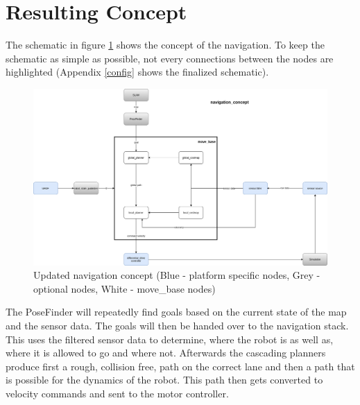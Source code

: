 \section{Resulting Concept}
The schematic in figure \ref{navconcept} shows the concept of the navigation.  To keep the schematic as simple as possible, not every connections between the nodes are highlighted (Appendix \ref{config} shows the finalized schematic).\\

\begin{figure}[H]
	\begin{center}
		\includegraphics[width=140mm]{Pictures/Updated navigation concept}
		\caption[updated navigation concept]{Updated navigation concept (Blue - platform specific nodes, Grey - optional nodes, White - move\_base nodes)}
		\label{navconcept}
	\end{center}
\end{figure}



The PoseFinder will repeatedly find goals based on the current state of the map and the sensor data. The goals will then be handed over to the navigation stack. This uses the filtered sensor data to determine, where the robot is as well as, where it is allowed to go and where not. Afterwards the cascading planners produce first a rough, collision free, path on the correct lane and then a path that is possible for the dynamics of the robot. This path then gets converted to velocity commands and sent to the motor controller.\\




